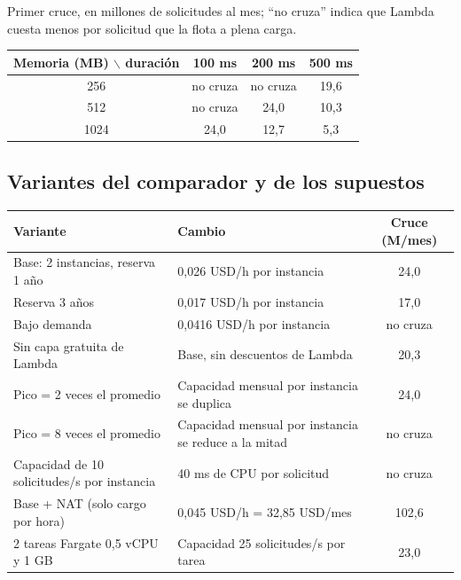 \documentclass[12pt, letterpaper, table, xcdraw]{inf-pucv}
\begin{document}
Primer cruce, en millones de solicitudes al mes; ``no cruza'' indica que Lambda cuesta menos por solicitud que la flota a plena carga.

{\small
\begin{center}
\begin{tabular}{|c|c|c|c|}
\hline
\textbf{Memoria (MB) $\backslash$ duración} & \textbf{100 ms} & \textbf{200 ms} & \textbf{500 ms} \\ \hline
256 & no cruza & no cruza & 19,6 \\ \hline
512 & no cruza & 24,0 & 10,3 \\ \hline
1024 & 24,0 & 12,7 & 5,3 \\ \hline
\end{tabular}
\end{center}
}

\subsection*{Variantes del comparador y de los supuestos}

{\small
\begin{center}
\begin{tabular}{|p{4.6cm}|p{5.4cm}|c|}
\hline
\textbf{Variante} & \textbf{Cambio} & \textbf{Cruce (M/mes)} \\ \hline
Base: 2 instancias, reserva 1 año & 0,026 USD/h por instancia & 24,0 \\ \hline
Reserva 3 años & 0,017 USD/h por instancia & 17,0 \\ \hline
Bajo demanda & 0,0416 USD/h por instancia & no cruza \\ \hline
Sin capa gratuita de Lambda & Base, sin descuentos de Lambda & 20,3 \\ \hline
Pico = 2 veces el promedio & Capacidad mensual por instancia se duplica & 24,0 \\ \hline
Pico = 8 veces el promedio & Capacidad mensual por instancia se reduce a la mitad & no cruza \\ \hline
Capacidad de 10 solicitudes/s por instancia & 40 ms de CPU por solicitud & no cruza \\ \hline
Base + NAT (solo cargo por hora) & 0,045 USD/h = 32,85 USD/mes & 102,6 \\ \hline
2 tareas Fargate 0,5 vCPU y 1 GB & Capacidad 25 solicitudes/s por tarea & 23,0 \\ \hline
\end{tabular}
\end{center}
}
\newpage
\end{document}
